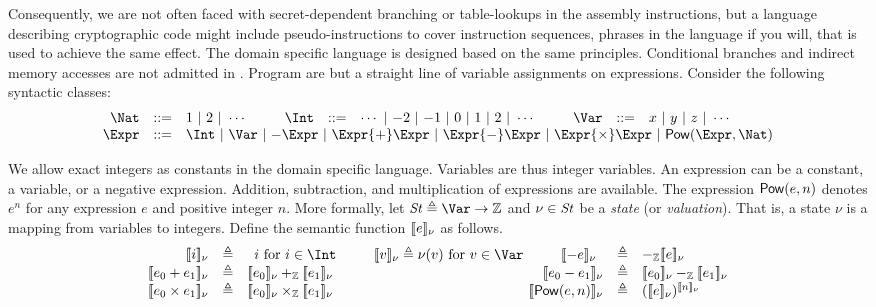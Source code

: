 Consequently, we are not often
faced with secret-dependent branching or table-lookups in the assembly
instructions, but a language describing cryptographic code might
include pseudo-instructions to cover instruction sequences, phrases in
the language if you will, that is used to achieve the same effect.
The domain specific language \mydsl is designed based on the same
principles. Conditional branches and indirect memory accesses are not
admitted in \mydsl. Program are but a straight line of variable
assignments on expressions. 
Consider the following syntactic classes:
\[
\begin{array}{rclcrclcrcl}
  \Nat & ::= & {1}\ |\ {2}\ |\ \cdots
  & \hspace{.02\columnwidth} &
  \Int & ::= & \cdots \ |\ {-2}\ |\ {-1} \ |\ 0\ |\ 
             {1}\ |\ {2}\ |\ \cdots
  & \hspace{.02\columnwidth} &
  \Var & ::= & {x} \ |\ {y} \ |\ {z} \ |\ \cdots\\
  \Expr & ::= &  \multicolumn{9}{l}
               { \Int \ |\ \Var \ |\  {-}\Expr \ |\ 
                 \Expr {+} \Expr \ |\ \Expr {-} \Expr \ |\ 
                 \Expr {\times} \Expr \ |\ \dslcode{Pow} (\Expr, \Nat) }
\end{array}
\]

We allow exact integers as constants in the domain specific
language. Variables are thus integer variables. An expression can be a
constant, a variable, or a negative expression. Addition, subtraction,
and multiplication of expressions are available. The expression
$\mbox{\textsf{Pow}}(e, n)$ denotes $e^n$ for any expression $e$ and positive
integer $n$. More formally, let $\St \defn \Var \rightarrow
\bbfZ$ and $\nu \in \mathit{St}$ be a \emph{state} (or \emph{valuation}). That is,
a {state} $\nu$ is a mapping from variables to integers. Define the
semantic function $[\![{e}]\!]_{\nu}$ as follows.
\[
\begin{array}{rclcrcl}
  \valueof{{i}}_{\nu} & \defn & 
  \multicolumn{3}{c}{
    \begin{array}{lcccr}
      i \textmd{  for ${i} \in \Int$} 
      & \hspace{.02\columnwidth} &
      \valueof{{v}}_{\nu} \defn \nu({v}) 
      \textmd{  for ${v} \in \Var$}
      & \hspace{.02\columnwidth} &
      \valueof{-e}_{\nu} 
    \end{array}
  }
  & \defn & -_{\bbfZ}\valueof{e}_{\nu}
  \\
  \valueof{e_0 + e_1}_{\nu} & \defn & 
     \valueof{e_0}_{\nu} +_{\bbfZ} \valueof{e_1}_{\nu}
  & \hspace{.1\columnwidth} &
  \valueof{e_0 - e_1}_{\nu} & \defn & 
     \valueof{e_0}_{\nu} -_{\bbfZ} \valueof{e_1}_{\nu}\\
  \valueof{e_0 \times e_1}_{\nu} & \defn & 
     \valueof{e_0}_{\nu} \times_{\bbfZ} \valueof{e_1}_{\nu}
  &&
  \valueof{\dslcode{Pow}(e, n)}_{\nu} & \defn & 
     (\valueof{e}_{\nu})^{\valueof{n}_{\nu}}
\end{array}
\]

